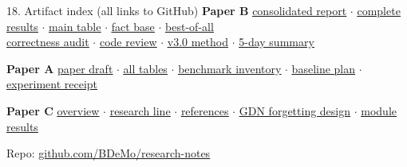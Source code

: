 \documentclass[aspectratio=169]{beamer}
\newcommand{\ghbase}{https://github.com/BDeMo/research-notes/blob/main/notes/plans/08-compressed-context-memory}
\newcommand{\ghB}[2]{\href{\ghbase/papers/paper-b-forgetting-gating/#1}{\color{blue}\underline{#2}}}
\newcommand{\ghC}[2]{\href{\ghbase/papers/paper-c-linear-attention/#1}{\color{blue}\underline{#2}}}
\newcommand{\ghA}[2]{\href{\ghbase/papers/paper-a-latent-memory/#1}{\color{blue}\underline{#2}}}
\begin{document}
\begin{frame}{18. Artifact index (all links to GitHub)}
  \scriptsize
  \textbf{Paper B} \quad
  \ghB{REPORT-2026-07-13.md}{consolidated report} $\cdot$
  \ghB{COMPLETE-RESULTS-2026-07-13.md}{complete results} $\cdot$
  \ghB{main-table-fulltest.md}{main table} $\cdot$
  \ghB{matrix-facts.md}{fact base} $\cdot$
  \ghB{best-of-all-baselines-2026-07-13.md}{best-of-all} \\
  \ghB{correctness-audit-2026-07-13.md}{correctness audit} $\cdot$
  \ghB{code-review-2026-07-13.md}{code review} $\cdot$
  \ghB{method-vNext-2026-07-13.md}{v3.0 method} $\cdot$
  \ghB{FIVE-DAY-SUMMARY-2026-07-08_13.md}{5-day summary}
  \vspace{0.7em}

  \textbf{Paper A} \quad
  \ghA{PAPER-A-draft-v0.1.md}{paper draft} $\cdot$
  \ghA{paper-a-all-benchmarks-skeleton-2026-07-21.md}{all tables} $\cdot$
  \ghA{paper-a-full-benchmark-table-2026-07-21.md}{benchmark inventory} $\cdot$
  \ghA{paper-baselines-v2-2026-07-19.md}{baseline plan} $\cdot$
  \ghA{experiment-receipt-2026-07-16.md}{experiment receipt}
  \vspace{0.7em}

  \textbf{Paper C} \quad
  \ghC{README.md}{overview} $\cdot$
  \ghC{PAPER-C-research-line.md}{research line} $\cdot$
  \ghC{references-linear-attention.md}{references} $\cdot$
  \ghC{gdn-forgetting-exploration.md}{GDN forgetting design} $\cdot$
  \ghC{gdn-module-results-2026-07-14.md}{module results}
  \vspace{0.9em}

  \centering \normalsize Repo: \href{https://github.com/BDeMo/research-notes}{\color{blue}\underline{github.com/BDeMo/research-notes}}
\end{frame}
\end{document}

